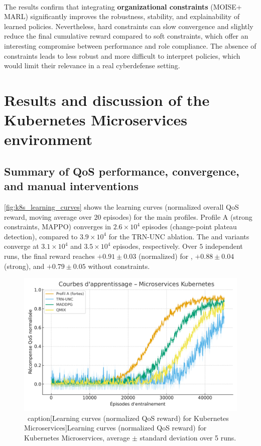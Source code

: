 \

The results confirm that integrating \textbf{organizational constraints} (MOISE+ \allowbreak MARL) significantly improves the robustness, stability, and explainability of learned policies.
Nevertheless, hard constraints can slow convergence and slightly reduce the final cumulative reward compared to soft constraints, which offer an interesting compromise between performance and role compliance.
The absence of constraints leads to less robust and more difficult to interpret policies, which would limit their relevance in a real cyberdefense setting.


\section{Results and discussion of the Kubernetes Microservices environment}\label{sec:results_and_discussion_ms}

\subsection* {Summary of QoS performance, convergence, and manual interventions}

\autoref{fig:k8s_learning_curves} shows the learning curves (normalized overall QoS reward, moving average over $20$ episodes) for the main profiles.
Profile A (strong constraints, MAPPO) converges in $2.6 \times 10^4$ episodes (change-point plateau detection), compared to $3.9 \times 10^4$ for the TRN-UNC ablation.
The  and  variants converge at $3.1\times 10^4$ and $3.5\times 10^4$ episodes, respectively.
Over $5$ independent runs, the final reward reaches $+0.91 \pm 0.03$ (normalized) for , $+0.88 \pm 0.04$ (strong), and $+0.79 \pm 0.05$ without constraints.

\begin{figure}[h!]
  \centering
  \includegraphics[width=0.75\linewidth]{figures/results_k8s_learning.pdf}
  \ caption[Learning curves (normalized QoS reward) for Kubernetes Microservices]{Learning curves (normalized QoS reward) for Kubernetes Microservices, average $\pm$ standard deviation over 5 runs.}
  \label{fig:k8s_learning_curves}
\end{figure}

